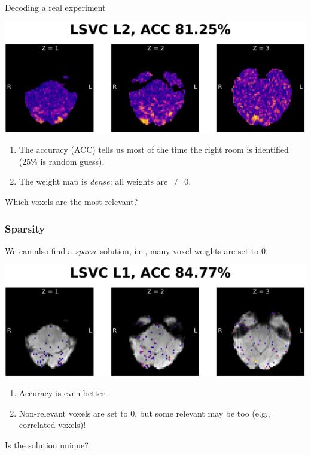 \documentclass[11pt]{beamer}
\begin{document}
\begin{frame}[squeeze]{Decoding a real experiment}

    \vspace*{-0.9cm}

    \begin{center}
        \includegraphics[scale=0.7]{figures/lsvc_l2-axial.png}
    \end{center}

    \vspace*{-0.2cm}

    \begin{enumerate}
        \item The accuracy (ACC) tells us most of the time the right room is
            identified (25\% is random guess).
        \item The weight map is \emph{dense}: all weights are $\neq$ 0.
    \end{enumerate}

    Which voxels are the most relevant?

\end{frame}
\begin{frame}
    \frametitle{Sparsity}

    We can also find a \emph{sparse} solution, i.e., many voxel weights are set
    to 0.
    
    \vspace*{-0.9cm}

    \begin{center}
        \includegraphics[scale=0.7]{figures/lsvc_l1-axial.png}
    \end{center}

    \vspace*{-0.2cm}

    \begin{enumerate}
        \item Accuracy is even better.
        \item Non-relevant voxels are set to 0, but some relevant may be too
            (e.g., correlated voxels)!
    \end{enumerate}

    Is the solution unique?

\end{frame}
\end{document}
